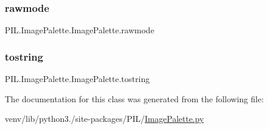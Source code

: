 \subsubsection{\texorpdfstring{rawmode}{rawmode}}
{\footnotesize\ttfamily P\+I\+L.\+Image\+Palette.\+Image\+Palette.\+rawmode}

\mbox{\label{classPIL_1_1ImagePalette_1_1ImagePalette_aba886925536ea1443865d0eb894cefd7}} 
\subsubsection{\texorpdfstring{tostring}{tostring}}
{\footnotesize\ttfamily P\+I\+L.\+Image\+Palette.\+Image\+Palette.\+tostring\hspace{0.3cm}{\ttfamily [static]}}



The documentation for this class was generated from the following file\+:\begin{DoxyCompactItemize}
\item 
venv/lib/python3./site-\/packages/\+P\+I\+L/\hyperlink{ImagePalette_8py}{Image\+Palette.\+py}\end{DoxyCompactItemize}
